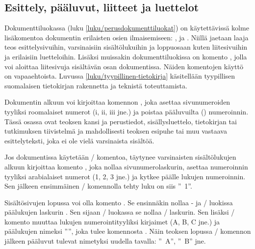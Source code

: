 \begin{koodilohkosis}
\newcommand{\sectionbreak}{\clearpage}
\end{koodilohkosis}

\subsection{Esittely, pääluvut, liitteet ja luettelot}
\label{luku/frontmainbackmatter}

Dokumenttiluokassa  (luku \ref{luku/perusdokumenttiluokat})
on käytettävissä kolme lisäkomentoa dokumentin erilaisten osien
ilmaisemiseen: ,  ja
. Niillä jaetaan laaja teos esittelysivuihin,
varsinaisiin sisältölukuihin ja loppuosaan kuten liitesivuihin ja
erilaisiin luetteloihin. Lisäksi muissakin dokumenttiluokissa on komento
, jolla voi aloittaa liitesivuja sisältävän osan
dokumentissa. Näiden komentojen käyttö on vapaaehtoista. Luvussa
\ref{luku/tyypillinen-tietokirja} käsitellään tyypillisen suomalaisen
tietokirjan rakennetta ja teknistä toteuttamista.

Dokumentin alkuun voi kirjoittaa komennon , joka
asettaa sivunumeroiden tyyliksi roomalaiset numerot (i, ii, iii jne.) ja
poistaa pääluvuilta () numeroinnin. Tässä osassa ovat
teoksen kansi ja perustiedot, sisällysluettelo, tietokirjan tai
tutkimuksen tiivistelmä ja mahdollisesti teoksen esipuhe tai muu
vastaava esittelyteksti, joka ei ole vielä varsinaista sisältöä.

Jos dokumentissa käytetään \-/ komentoa, täytynee
varsinaisten sisältölukujen alkuun kirjoittaa komento
, joka nollaa sivunumerolaskurin, asettaa
numeroinnin tyyliksi arabialaiset numerot (1, 2, 3 jne.) ja kytkee
päälle lukujen numeroinnin. Sen jälkeen ensimmäinen \-/
komennolla tehty luku on siis ''\chaptername~1''.

Sisältösivujen lopussa voi olla komento . Se
ensinnäkin nollaa - ja \-/ luokissa
päälukujen laskurin . Sen sijaan \-/
luokassa se nollaa \-/ laskurin. Sen lisäksi
\-/ komento muuttaa lukujen numerointityyliksi
kirjaimet (A, B, C jne.) ja päälukujen nimeksi ''\appendixname'', joka
tulee komennosta . Näin teoksen lopussa
\-/ komennon jälkeen pääluvut tulevat nimetyksi
uudella tavalla: ''\appendixname~A'', ''\appendixname~B'' jne.


